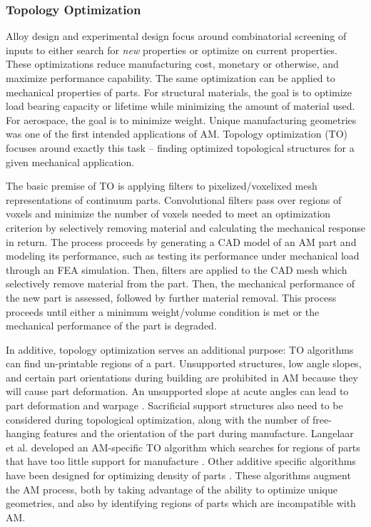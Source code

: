 \subsubsection{Topology Optimization}
Alloy design and experimental design focus around combinatorial screening of inputs to either search for \textit{new} properties or optimize on current properties. These optimizations reduce manufacturing cost, monetary or otherwise, and maximize performance capability. The same optimization can be applied to mechanical properties of parts. For structural materials, the goal is to optimize load bearing capacity or lifetime while minimizing the amount of material used. For aerospace, the goal is to minimize weight. Unique manufacturing geometries was one of the first intended applications of AM. Topology optimization (TO) focuses around exactly this task -- finding optimized topological structures for a given mechanical application. 

The basic premise of TO is applying filters to pixelized/voxelixed mesh representations of continuum parts. Convolutional filters pass over regions of voxels and minimize the number of voxels needed to meet an optimization criterion by selectively removing material and calculating the mechanical response in return. The process proceeds by generating a CAD model of an AM part and modeling its performance, such as testing its performance under mechanical load through an FEA simulation. Then, filters are applied to the CAD mesh which selectively remove material from the part. Then, the mechanical performance of the new part is assessed, followed by further material removal. This process proceeds until either a minimum weight/volume condition is met or the mechanical performance of the part is degraded.

In additive, topology optimization serves an additional purpose: TO algorithms can find un-printable regions of a part. Unsupported structures, low angle slopes, and certain part orientations during building are prohibited in AM because they will cause part deformation. An unsupported slope at acute angles can lead to part deformation and warpage \cite{Gaynor2016}. Sacrificial support structures also need to be considered during topological optimization, along with the number of free-hanging features and the orientation of the part during manufacture. Langelaar et al. developed an AM-specific TO algorithm which searches for regions of parts that have too little support for manufacture \cite{Langelaar2016, Langelaar2017}. Other additive specific algorithms have been designed for optimizing density of parts \cite{Zegard2016}. These algorithms augment the AM process, both by taking advantage of the ability to optimize unique geometries, and also by identifying regions of parts which are incompatible with AM.
